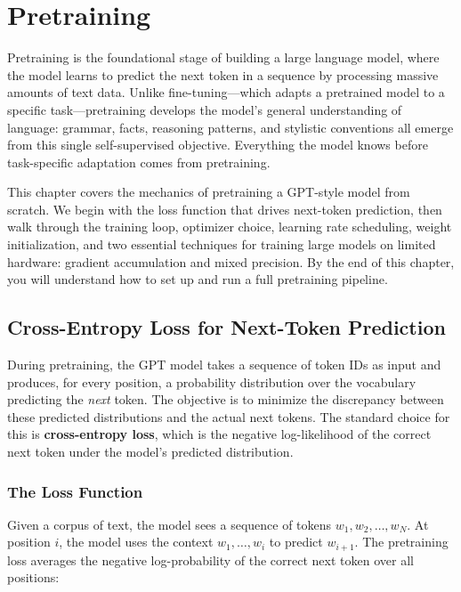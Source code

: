 \chapter{Pretraining}

Pretraining is the foundational stage of building a large language model, where the model learns to predict the next token in a sequence by processing massive amounts of text data. Unlike fine-tuning---which adapts a pretrained model to a specific task---pretraining develops the model's general understanding of language: grammar, facts, reasoning patterns, and stylistic conventions all emerge from this single self-supervised objective. Everything the model knows before task-specific adaptation comes from pretraining.

This chapter covers the mechanics of pretraining a GPT-style model from scratch. We begin with the loss function that drives next-token prediction, then walk through the training loop, optimizer choice, learning rate scheduling, weight initialization, and two essential techniques for training large models on limited hardware: gradient accumulation and mixed precision. By the end of this chapter, you will understand how to set up and run a full pretraining pipeline.

\section{Cross-Entropy Loss for Next-Token Prediction}

During pretraining, the GPT model takes a sequence of token IDs as input and produces, for every position, a probability distribution over the vocabulary predicting the \emph{next} token. The objective is to minimize the discrepancy between these predicted distributions and the actual next tokens. The standard choice for this is \textbf{cross-entropy loss}, which is the negative log-likelihood of the correct next token under the model's predicted distribution.

\subsection{The Loss Function}

Given a corpus of text, the model sees a sequence of tokens $w_1, w_2, \ldots, w_N$. At position $i$, the model uses the context $w_1, \ldots, w_i$ to predict $w_{i+1}$. The pretraining loss averages the negative log-probability of the correct next token over all positions:

